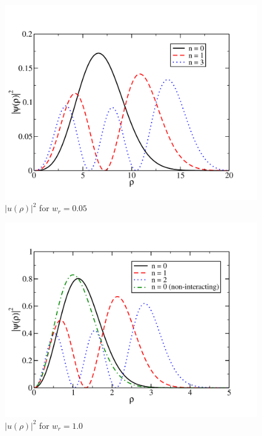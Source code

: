 \documentclass[prc,amsmath,twocolumn,superscriptaddress]{revtex4}
\begin{document}
\begin{figure}[b]
\includegraphics[scale=0.33]{wf_05.pdf}
\caption{$|u(\rho)|^2$ for $w_r = 0.05$}
\label{algorithm}
\end{figure}

\begin{figure}[t]
\includegraphics[scale=0.33]{wf_1.pdf}
\caption{$|u(\rho)|^2$ for $w_r = 1.0$}
\label{algorithm}
\end{figure}
\end{document}

